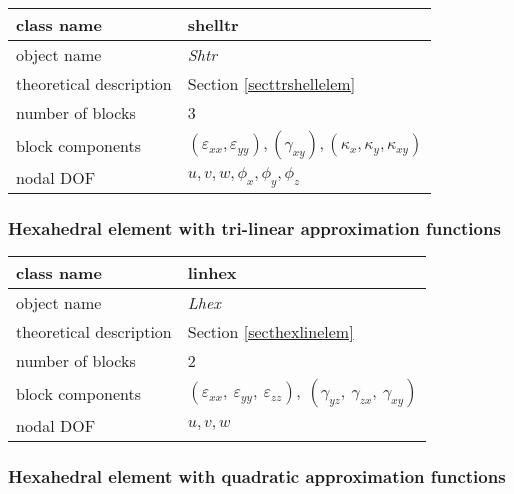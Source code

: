 \begin{center}
\begin{tabular}{|l|l|}
\hline
class name & {\sf shelltr}\index{class!{\sf shelltr}}
\\ \hline
object name & {\it Shtr}\index{instance!{\it Shtr}}
\\ \hline
theoretical description & Section \ref{secttrshellelem}
\\ \hline
number of blocks & 3
\\ \hline
block components & $(\varepsilon_{xx},\varepsilon_{yy}), (\gamma_{xy}), (\kappa_x,\kappa_y,\kappa_{xy})$
\\ \hline
nodal DOF & $u,v,w,\phi_x,\phi_y,\phi_z$
\\ \hline
\end{tabular}
\end{center}

\subsubsection{Hexahedral element with tri-linear approximation functions}

\begin{center}
\begin{tabular}{|l|l|}
\hline
class name & {\sf linhex}\index{class!{\sf linhex}}
\\ \hline
object name & {\it Lhex}\index{instance!{\it Lhex}}
\\ \hline
theoretical description & Section \ref{secthexlinelem}
\\ \hline
number of blocks & 2
\\ \hline
block components & $(\varepsilon_{xx},\ \varepsilon_{yy},\ \varepsilon_{zz}),\ (\gamma_{yz},\ \gamma_{zx},\ \gamma_{xy})$
\\ \hline
nodal DOF & $u,v,w$
\\ \hline
\end{tabular}
\end{center}

\subsubsection{Hexahedral element with quadratic approximation functions}

